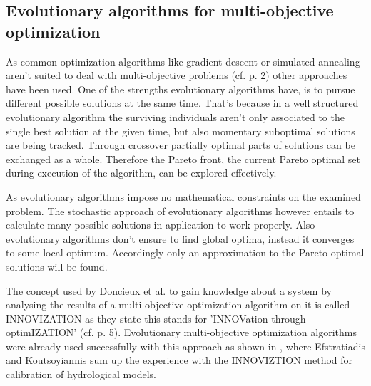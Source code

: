 \documentclass[12pt,twoside]{article}
\theoremstyle{plain}
\theoremstyle{definition}
\theoremstyle{remark}
\begin{document}
\subsection{Evolutionary algorithms for multi-objective optimization}
\label{back:evo_in_multi-opt}
As common optimization-algorithms like gradient descent or simulated annealing aren't suited to deal with multi-objective problems (cf. \cite{fonseca1995overview} p. 2) other approaches have been used.
One of the strengths evolutionary algorithms have, is to pursue different possible solutions at the same time. That's because in a well structured evolutionary algorithm the surviving individuals aren't only associated to the single best solution at the given time, but also momentary suboptimal solutions are being tracked.
Through crossover partially optimal parts of solutions can be exchanged as a whole. 
Therefore the Pareto front, the current Pareto optimal set during execution of the algorithm, can be explored effectively.

As evolutionary algorithms impose no mathematical constraints on the examined problem. The stochastic approach of evolutionary algorithms however entails to calculate many possible solutions in application to work properly. Also evolutionary algorithms don't ensure to find global optima, instead it converges to some local optimum. Accordingly only an approximation to the Pareto optimal solutions will be found.

The concept used by Doncieux et al. to gain knowledge about a system by analysing the results of a multi-objective optimization algorithm on it is called INNOVIZATION as they state this stands for 'INNOVation through optimIZATION' (cf. \cite{doncieux2015multi} p. 5).
Evolutionary multi-objective optimization algorithms were already used successfully with this approach as shown in \cite{efstratiadis2010one}, where Efstratiadis and Koutsoyiannis sum up the experience with the INNOVIZTION method for calibration of hydrological models.
\end{document}
